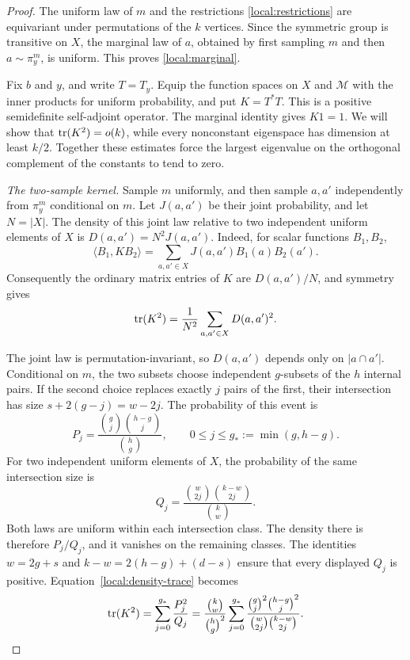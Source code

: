 \begin{proof}
The uniform law of $m$ and the restrictions
\eqref{local:restrictions} are equivariant under permutations of the
$k$ vertices.  Since the symmetric group is transitive on $X$, the
marginal law of $a$, obtained by first sampling $m$ and then
$a\sim\pi_y^m$, is uniform.  This proves \eqref{local:marginal}.

Fix $b$ and $y$, and write $T=T_y$.  Equip the function spaces on $X$
and $\mathcal M$ with the inner products for uniform probability, and
put $K=T^*T$.  This is a positive semidefinite self-adjoint operator.
The marginal identity gives $K1=1$.  We will show that
$\operatorname{tr}(K^2)=o(k)$, while every nonconstant eigenspace has dimension at
least $k/2$.  Together these estimates force the largest eigenvalue
on the orthogonal complement of the constants to tend to zero.

\emph{The two-sample kernel.}
Sample $m$ uniformly, and then sample $a,a'$ independently from
$\pi_y^m$ conditional on $m$.  Let $J(a,a')$ be their joint
probability, and let $N=|X|$.  The density of this joint law relative
to two independent uniform elements of $X$ is
$D(a,a')=N^2J(a,a')$.  Indeed, for scalar functions $B_1,B_2$,
\[
  \langle B_1,KB_2\rangle
   =\sum_{a,a'\in X}J(a,a')B_1(a)B_2(a').
\]
Consequently the ordinary matrix entries of $K$ are $D(a,a')/N$, and
symmetry gives
\begin{equation}
  \operatorname{tr}(K^2)=\frac1{N^2}\sum_{a,a'\in X}D(a,a')^2.
  \label{local:density-trace}
\end{equation}

The joint law is permutation-invariant, so $D(a,a')$ depends only on
$|a\cap a'|$.  Conditional on $m$, the two subsets choose independent
$g$-subsets of the $h$ internal pairs.  If the second choice replaces
exactly $j$ pairs of the first, their intersection has size
$s+2(g-j)=w-2j$.  The probability of this event is
\[
  P_j=\frac{\binom gj\binom{h-g}j}{\binom hg},
  \qquad 0\le j\le g_*:=\min(g,h-g).
\]
For two independent uniform elements of $X$, the probability of the
same intersection size is
\[
  Q_j=\frac{\binom w{2j}\binom{k-w}{2j}}{\binom kw}.
\]
Both laws are uniform within each intersection class.  The density
there is therefore $P_j/Q_j$, and it vanishes on the remaining
classes.  The identities
$w=2g+s$ and $k-w=2(h-g)+(d-s)$ ensure that every displayed $Q_j$
is positive.  Equation~\eqref{local:density-trace} becomes
\begin{equation}
  \operatorname{tr}(K^2)
   =\sum_{j=0}^{g_*}\frac{P_j^2}{Q_j}
   =\frac{\binom kw}{\binom hg^2}
      \sum_{j=0}^{g_*}
      \frac{\binom gj^2\binom{h-g}j^2}
           {\binom w{2j}\binom{k-w}{2j}}.
  \label{local:trace-formula}
\end{equation}


\end{proof}
